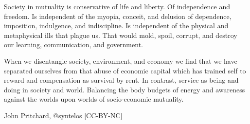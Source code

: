 Society in mutuality is conservative of life and liberty.  Of
independence and freedom.  Is independent of the myopia, conceit, and
delusion of dependence, imposition, indulgence, and indiscipline.  Is
independent of the physical and metaphysical ills that plague us.
That would mold, spoil, corrupt, and destroy our learning,
communication, and government.

When we disentangle society, environment, and economy we find that we
have separated ourselves from that abuse of economic capital which has
trained self to reward and compensation as survival by rent.  In
contrast, service as being and doing in society and world.  Balancing
the body budgets of energy and awareness against the worlds upon
worlds of socio-economic mutuality.

{\tail John Pritchard, @syntelos [CC-BY-NC]}

\bye
